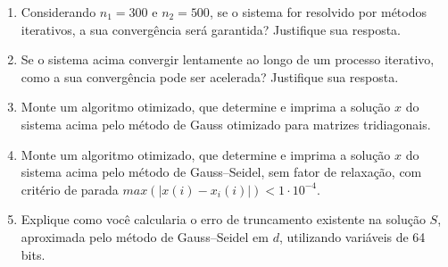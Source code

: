 \documentclass[12pt]{article}
\newenvironment{smallitem}{
    \vspace{-2mm}
    \begin{enumerate}
    \setlength{\parskip}{0pt}
    \setlength{\itemsep}{2pt}
}{
    \vspace{-2mm}
    \end{enumerate}
}
\begin{document}
\begin{enumerate}[label=\textbf{\arabic*})]
\begin{smallitem}

\item Considerando $n_1 = 300$ e $n_2 = 500$, se o sistema for resolvido por
métodos iterativos, a sua convergência será garantida? Justifique sua
resposta.

\item Se o sistema acima convergir lentamente ao longo de um processo
iterativo, como a sua convergência pode ser acelerada? Justifique sua
resposta.

\item Monte um algoritmo otimizado, que determine e imprima a solução $x$ do
sistema acima pelo método de Gauss otimizado para matrizes tridiagonais.

\item Monte um algoritmo otimizado, que determine e imprima a solução $x$ do
sistema acima pelo método de Gauss--Seidel, sem fator de relaxação, com
critério de parada $max(\vert x(i) - x_i(i) \vert) < 1 \cdot 10^{-4}$.

\item Explique como você calcularia o erro de truncamento existente na solução
$S$, aproximada pelo método de Gauss--Seidel em $d$, utilizando variáveis de
64 bits.

\end{smallitem}


\end{enumerate}
\end{document}
